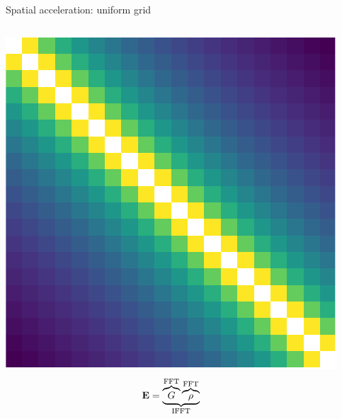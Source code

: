 \documentclass[aspectratio=169, usenames, dvipsnames]{beamer}
\begin{document}
\begin{frame}{Spatial acceleration: uniform grid}
\begin{columns}
      \begin{center}
        \includegraphics[height=0.4\textheight]{figures/grid_1d}
        \begin{equation*}
          \vb{E} = \underbrace{\overbrace{G}^\text{FFT} \overbrace{\rho}^\text{FFT}}_\text{IFFT}
        \end{equation*}
      \end{center}
  \end{columns}
\end{frame}
\end{document}
